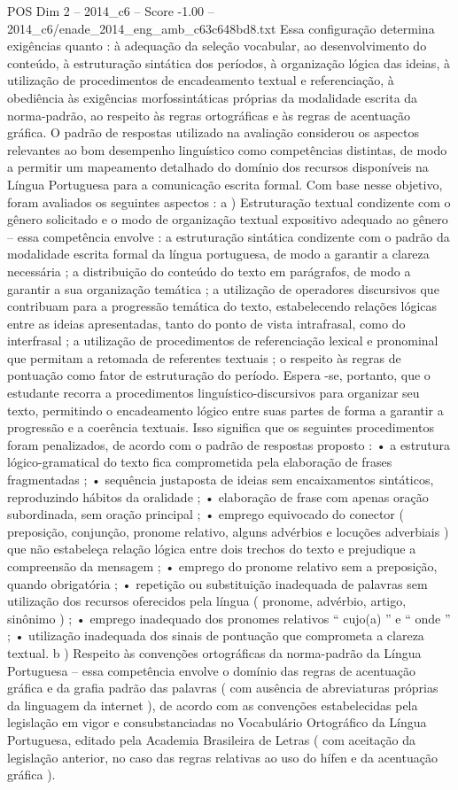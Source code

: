 \begin{textsample}{POS Dim 2 – 2014\_c6 – Score -1.00 – 2014\_c6/enade\_2014\_eng\_amb\_c63c648bd8.txt}
Essa configuração determina exigências quanto : à adequação da seleção vocabular, ao desenvolvimento do conteúdo, à estruturação sintática dos períodos, à organização lógica das ideias, à utilização de procedimentos de encadeamento textual e referenciação, à obediência às exigências morfossintáticas próprias da modalidade escrita da norma-padrão, ao respeito às regras ortográficas e às regras de acentuação gráfica.
O padrão de respostas utilizado na avaliação considerou os aspectos relevantes ao bom desempenho linguístico como competências distintas, de modo a permitir um mapeamento detalhado do domínio dos recursos disponíveis na Língua Portuguesa para a comunicação escrita formal.
Com base nesse objetivo, foram avaliados os seguintes aspectos : a ) Estruturação textual condizente com o gênero solicitado e o modo de organização textual expositivo adequado ao gênero – essa competência envolve : a estruturação sintática condizente com o padrão da modalidade escrita formal da língua portuguesa, de modo a garantir a clareza necessária ; a distribuição do conteúdo do texto em parágrafos, de modo a garantir a sua organização temática ; a utilização de operadores discursivos que contribuam para a progressão temática do texto, estabelecendo relações lógicas entre as ideias apresentadas, tanto do ponto de vista intrafrasal, como do interfrasal ; a utilização de procedimentos de referenciação lexical e pronominal que permitam a retomada de referentes textuais ; o respeito às regras de pontuação como fator de estruturação do período.
Espera -se, portanto, que o estudante recorra a procedimentos linguístico-discursivos para organizar seu texto, permitindo o encadeamento lógico entre suas partes de forma a garantir a progressão e a coerência textuais.
Isso significa que os seguintes procedimentos foram penalizados, de acordo com o padrão de respostas proposto : • a estrutura lógico-gramatical do texto fica comprometida pela elaboração de frases fragmentadas ; • sequência justaposta de ideias sem encaixamentos sintáticos, reproduzindo hábitos da oralidade ; • elaboração de frase com apenas oração subordinada, sem oração principal ; • emprego equivocado do conector ( preposição, conjunção, pronome relativo, alguns advérbios e locuções adverbiais ) que não estabeleça relação lógica entre dois trechos do texto e prejudique a compreensão da mensagem ; • emprego do pronome relativo sem a preposição, quando obrigatória ; • repetição ou substituição inadequada de palavras sem utilização dos recursos oferecidos pela língua ( pronome, advérbio, artigo, sinônimo ) ; • emprego inadequado dos pronomes relativos “ cujo(a) ” e “ onde ” ; • utilização inadequada dos sinais de pontuação que comprometa a clareza textual. b ) Respeito às convenções ortográficas da norma-padrão da Língua Portuguesa – essa competência envolve o domínio das regras de acentuação gráfica e da grafia padrão das palavras ( com ausência de abreviaturas próprias da linguagem da internet ), de acordo com as convenções estabelecidas pela legislação em vigor e consubstanciadas no Vocabulário Ortográfico da Língua Portuguesa, editado pela Academia Brasileira de Letras ( com aceitação da legislação anterior, no caso das regras relativas ao uso do hífen e da acentuação gráfica ).

\end{textsample}
